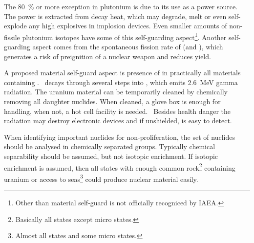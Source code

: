 The \SI{80}{\%} or more  exception in plutonium is due to its use as a power source. The power is extracted from decay heat, which may degrade, melt or even self-explode any high explosives in implosion devices. Even smaller amounts of non-fissile plutonium isotopes have some of this self-guarding aspect\footnote{Other than  material self-guard is not officially recogniced by IAEA.}. Another self-guarding aspect comes from the spontaneous fission rate of  (and ), which generates a risk of preignition of a nuclear weapon and reduces yield.~\cite{Yoshiki_2011, Forsberg}

A proposed material self-guard aspect is presence of  in practically all materials containing .~\cite{Isotalo2007}  decays through several steps into , which emits \SI{2.6}{MeV} gamma radiation. The uranium material can be temporarily cleaned by chemically removing all daughter nuclides. When cleaned, a glove box is enough for handling, when not, a hot cell facility is needed.~\cite{Forsberg_1999} Besides health danger the radiation may destroy electronic devices and if unshielded, is easy to detect.


When identifying important nuclides for non-proliferation, the set of nuclides should be analysed in chemically separated groups. Typically chemical separability should be assumed, but not isotopic enrichment. If isotopic enrichment is assumed, then all states with enough common rock\footnote{Basically all states except micro states.} containing uranium or access to seas\footnote{Almost all states and some micro states.} could produce nuclear material easily.




